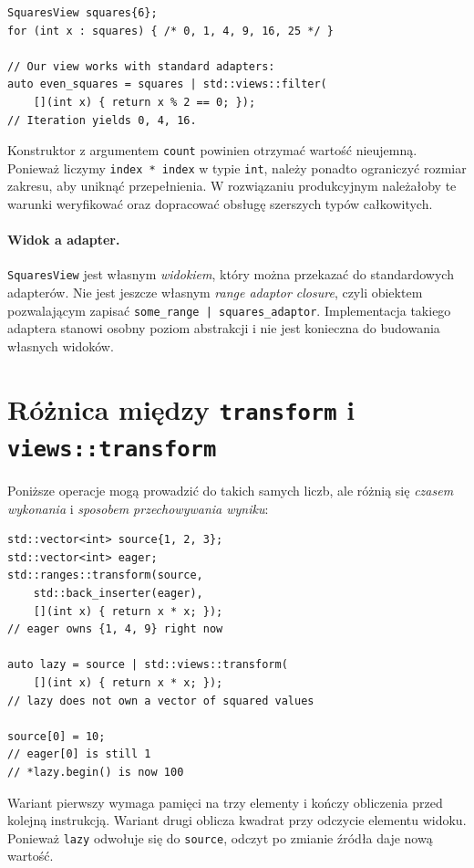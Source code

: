 \begin{lstlisting}
SquaresView squares{6};
for (int x : squares) { /* 0, 1, 4, 9, 16, 25 */ }

// Our view works with standard adapters:
auto even_squares = squares | std::views::filter(
    [](int x) { return x % 2 == 0; });
// Iteration yields 0, 4, 16.
\end{lstlisting}

Konstruktor z argumentem \texttt{count} powinien otrzymać wartość
nieujemną. Ponieważ liczymy \texttt{index * index} w typie
\texttt{int}, należy ponadto ograniczyć rozmiar zakresu, aby uniknąć
przepełnienia. W rozwiązaniu produkcyjnym należałoby te warunki
weryfikować oraz dopracować obsługę szerszych typów całkowitych.

\paragraph{Widok a adapter.}
\texttt{SquaresView} jest własnym \emph{widokiem}, który można
przekazać do standardowych adapterów. Nie jest jeszcze własnym
\emph{range adaptor closure}, czyli obiektem pozwalającym zapisać
\texttt{some\_range | squares\_adaptor}. Implementacja takiego
adaptera stanowi osobny poziom abstrakcji i nie jest konieczna do
budowania własnych widoków.

\section{Różnica między \texttt{transform} i \texttt{views::transform}}

Poniższe operacje mogą prowadzić do takich samych liczb, ale różnią
się \emph{czasem wykonania} i \emph{sposobem przechowywania wyniku}:

\begin{lstlisting}
std::vector<int> source{1, 2, 3};
std::vector<int> eager;
std::ranges::transform(source,
    std::back_inserter(eager),
    [](int x) { return x * x; });
// eager owns {1, 4, 9} right now

auto lazy = source | std::views::transform(
    [](int x) { return x * x; });
// lazy does not own a vector of squared values

source[0] = 10;
// eager[0] is still 1
// *lazy.begin() is now 100
\end{lstlisting}

Wariant pierwszy wymaga pamięci na trzy elementy i kończy obliczenia
przed kolejną instrukcją. Wariant drugi oblicza kwadrat przy odczycie
elementu widoku. Ponieważ \texttt{lazy} odwołuje się do
\texttt{source}, odczyt po zmianie źródła daje nową wartość.

